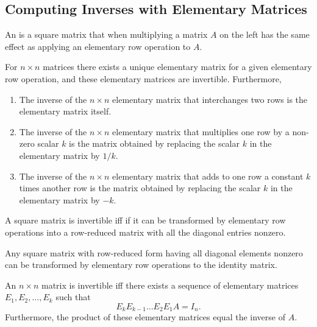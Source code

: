 \subsection{Computing Inverses with Elementary Matrices}
\begin{definition}
  An  is a square matrix that when multiplying a matrix $A$ on the left has the 
  same effect as applying an elementary row operation to $A$.
\end{definition}

\begin{theorem}
  For $n \times n$ matrices there exists a unique elementary matrix for a given elementary row operation, and these
  elementary matrices are invertible. Furthermore,
  \begin{enumerate}
    \item The inverse of the $n \times n$ elementary matrix that interchanges two rows is the elementary matrix itself.
    \item The inverse of the $n \times n$ elementary matrix that multiplies one row by a non-zero scalar $k$
      is the matrix obtained by replacing the scalar $k$ in the elementary matrix by $1/k$.
    \item The inverse of the $n \times n$ elementary matrix that adds to one row a constant $k$ times another
      row is the matrix obtained by replacing the scalar $k$ in the elementary matrix by $-k$.
  \end{enumerate}
\end{theorem}

\begin{lemma}
  A square matrix is invertible iff if it can be transformed by elementary row operations into a row-reduced matrix
  with all the diagonal entries nonzero.
\end{lemma}

\begin{lemma}
  Any square matrix with row-reduced form having all diagonal elements nonzero can be transformed by elementary
  row operations to the identity matrix.
\end{lemma}

\begin{theorem}
  An $n \times n$ matrix is invertible iff there exists a sequence of elementary matrices $E_{1}, E_{2}, \dots, E_{k}$
  such that 
  \begin{equation*}
    E_{k}E_{k - 1}\dots E_{2}E_{1}A = I_{n}.
  \end{equation*}
  Furthermore, the product of these elementary matrices equal the inverse of $A$.
\end{theorem}

